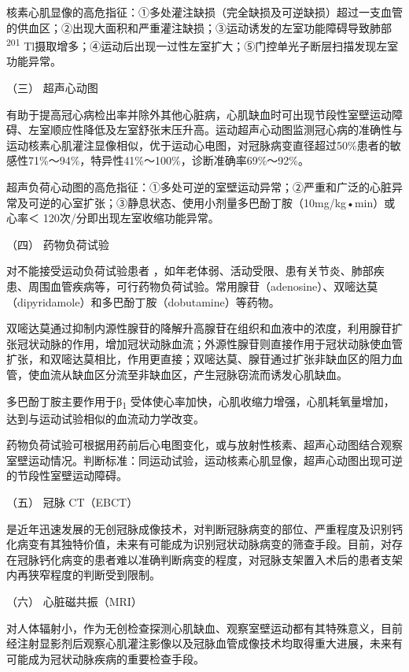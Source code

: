 核素心肌显像的高危指征：①多处灌注缺损（完全缺损及可逆缺损）超过一支血管的供血区；②出现大面积和严重灌注缺损；③运动诱发的左室功能障碍导致肺部\textsuperscript{201}
Tl摄取增多；④运动后出现一过性左室扩大；⑤门控单光子断层扫描发现左室功能异常。

\hypertarget{text00309.htmlux5cux23CHP10-7-2-2-3}{}
（三） 超声心动图

有助于提高冠心病检出率并除外其他心脏病，心肌缺血时可出现节段性室壁运动障碍、左室顺应性降低及左室舒张末压升高。运动超声心动图监测冠心病的准确性与运动核素心肌灌注显像相似，优于运动心电图，对冠脉病变直径超过50\%患者的敏感性71\%～94\%，特异性41\%～100\%，诊断准确率69\%～92\%。

超声负荷心动图的高危指征：①多处可逆的室壁运动异常；②严重和广泛的心脏异常及可逆的心室扩张；③静息状态、使用小剂量多巴酚丁胺（10mg/kg•min）或心率＜
120次/分即出现左室收缩功能异常。

\hypertarget{text00309.htmlux5cux23CHP10-7-2-2-4}{}
（四） 药物负荷试验

对不能接受运动负荷试验患者
，如年老体弱、活动受限、患有关节炎、肺部疾患、周围血管疾病等，可行药物负荷试验。常用腺苷（adenosine）、双嘧达莫（dipyridamole）和多巴酚丁胺（dobutamine）等药物。

双嘧达莫通过抑制内源性腺苷的降解升高腺苷在组织和血液中的浓度，利用腺苷扩张冠状动脉的作用，增加冠状动脉血流；外源性腺苷则直接作用于冠状动脉使血管扩张，和双嘧达莫相比，作用更直接；双嘧达莫、腺苷通过扩张非缺血区的阻力血管，使血流从缺血区分流至非缺血区，产生冠脉窃流而诱发心肌缺血。

多巴酚丁胺主要作用于β\textsubscript{1}
受体使心率加快，心肌收缩力增强，心肌耗氧量增加，达到与运动试验相似的血流动力学改变。

药物负荷试验可根据用药前后心电图变化，或与放射性核素、超声心动图结合观察室壁运动情况。判断标准：同运动试验，运动核素心肌显像，超声心动图出现可逆的节段性室壁运动障碍。

\hypertarget{text00309.htmlux5cux23CHP10-7-2-2-5}{}
（五） 冠脉 CT（EBCT）

是近年迅速发展的无创冠脉成像技术，对判断冠脉病变的部位、严重程度及识别钙化病变有其独特价值，未来有可能成为识别冠状动脉病变的筛查手段。目前，对存在冠脉钙化病变的患者难以准确判断病变的程度，对冠脉支架置入术后的患者支架内再狭窄程度的判断受到限制。

\hypertarget{text00309.htmlux5cux23CHP10-7-2-2-6}{}
（六） 心脏磁共振（MRI）

对人体辐射小，作为无创检查探测心肌缺血、观察室壁运动都有其特殊意义，目前经注射显影剂后观察心肌灌注影像以及冠脉血管成像技术均取得重大进展，未来有可能成为冠状动脉疾病的重要检查手段。

